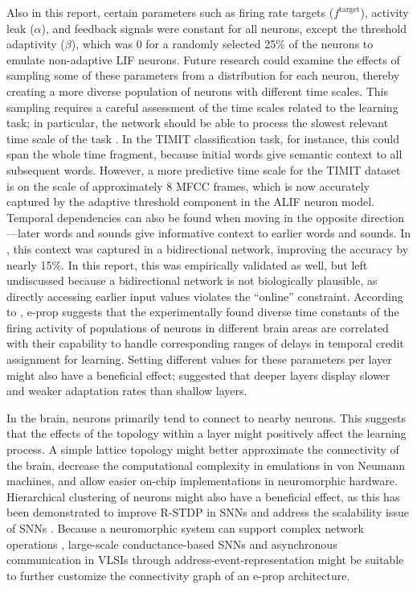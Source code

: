    Also in this report, certain parameters such as firing rate targets ($f^\text{target}$), activity leak ($\alpha$), and feedback signals were constant for all neurons, except the threshold adaptivity ($\beta$), which was 0 for a randomly selected 25\% of the neurons to emulate non-adaptive LIF neurons.
    Future research could examine the effects of sampling some of these parameters from a distribution for each neuron, thereby creating a more diverse population of neurons with different time scales.
    This sampling requires a careful assessment of the time scales related to the learning task; in particular, the network should be able to process the slowest relevant time scale of the task \citep{jaeger2021dimensions}.
    In the TIMIT classification task, for instance, this could span the whole time fragment, because initial words give semantic context to all subsequent words.
    However, a more predictive time scale for the TIMIT dataset is on the scale of approximately 8 MFCC frames, which is now accurately captured by the adaptive threshold component in the ALIF neuron model.
    Temporal dependencies can also be found when moving in the opposite direction---later words and sounds give informative context to earlier words and sounds.
    In \citet{bellec2020solution}, this context was captured in a bidirectional network, improving the accuracy by nearly 15\%.
    In this report, this was empirically validated as well, but left undiscussed because a bidirectional network is not biologically plausible, as directly accessing earlier input values violates the ``online'' constraint.
    According to \citet{bellec2020solution}, e-prop suggests that the experimentally found diverse time constants of the firing activity of populations of neurons in different brain areas \citep{runyan2017distinct} are correlated with their capability to handle corresponding ranges of delays in temporal credit assignment for learning.
    Setting different values for these parameters per layer might also have a beneficial effect; \citet{ahmed1998estimates} suggested that deeper layers display slower and weaker adaptation rates than shallow layers.

    In the brain, neurons primarily tend to connect to nearby neurons.
    This suggests that the effects of the topology within a layer might positively affect the learning process.
    A simple lattice topology might better approximate the connectivity of the brain, decrease the computational complexity in emulations in von Neumann machines, and allow easier on-chip implementations in neuromorphic hardware.
    Hierarchical clustering of neurons might also have a beneficial effect, as this has been demonstrated to improve R-STDP in SNNs \citep{weidel2021unsupervised} and address the scalability issue of SNNs \citep{carrillo2012scalable}.
    Because a neuromorphic system can support complex network operations \citep{hasler1990vlsi}, large-scale conductance-based SNNs \citep{yang2019scalable,Yang2019RealTimeNS} and asynchronous communication in VLSIs through address-event-representation \citep{lazzaro1993silicon,deiss1999pulse} might be suitable to further customize the connectivity graph of an e-prop architecture.

